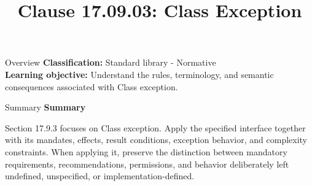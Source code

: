 \documentclass[10pt,letterpaper]{article}
\title{Clause 17.09.03: Class Exception}
\author{}
\date{}
\begin{document}
\maketitle
\begin{CornellOverviewBox}{Overview}
\textbf{Classification:} Standard library - Normative\\[2pt]
\textbf{Learning objective:} Understand the rules, terminology, and semantic consequences associated with Class exception.
\end{CornellOverviewBox}\begin{CornellSummaryBox}{Summary}
{\sffamily\bfseries\color{Accent} Summary}\par\vspace{3pt}Section 17.9.3 focuses on Class exception. Apply the specified interface together with its mandates, effects, result conditions, exception behavior, and complexity constraints. When applying it, preserve the distinction between mandatory requirements, recommendations, permissions, and behavior deliberately left undefined, unspecified, or implementation-defined.
\end{CornellSummaryBox}
\end{document}
